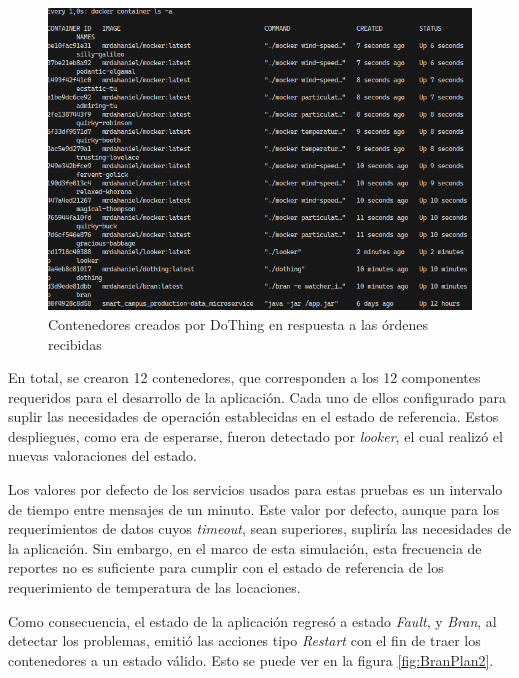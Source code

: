 \begin{figure}[ht]
    \centering
    \caption{Contenedores creados por DoThing en respuesta a las órdenes recibidas}
    \label{fig:ContainerState}
    \includegraphics[width=1\linewidth]{images/ContainerLaunching.png}
    \vspace{-4mm}
\end{figure}

En total, se crearon 12 contenedores, que corresponden a los 12 componentes requeridos para el desarrollo de la aplicación. Cada uno de ellos configurado para suplir las necesidades de operación establecidas en el estado de referencia. Estos despliegues, como era de esperarse, fueron detectado por \textit{looker}, el cual realizó el nuevas valoraciones del estado. 

Los valores por defecto de los servicios usados para estas pruebas es un intervalo de tiempo entre mensajes de un minuto. Este valor por defecto, aunque para los requerimientos de datos cuyos \textit{timeout}, sean superiores, supliría las necesidades de la aplicación. Sin embargo, en el marco de esta simulación, esta frecuencia de reportes no es suficiente para cumplir con el estado de referencia de los requerimiento de temperatura de las locaciones.

Como consecuencia, el estado de la aplicación regresó a estado \textit{Fault}, y \textit{Bran}, al detectar los problemas, emitió las acciones tipo \textit{Restart} con el fin de traer los contenedores a un estado válido. Esto se puede ver en la figura \ref{fig:BranPlan2}.

